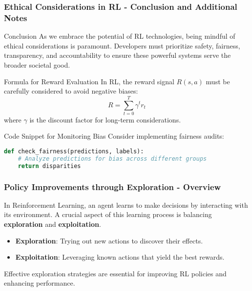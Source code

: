 \documentclass{beamer}
\begin{document}
\begin{frame}[fragile]
    \frametitle{Ethical Considerations in RL - Conclusion and Additional Notes}
    \begin{block}{Conclusion}
        As we embrace the potential of RL technologies, being mindful of ethical considerations is paramount. Developers must prioritize safety, fairness, transparency, and accountability to ensure these powerful systems serve the broader societal good.
    \end{block}
    
    \begin{block}{Formula for Reward Evaluation}
        In RL, the reward signal \( R(s, a) \) must be carefully considered to avoid negative biases:
        \begin{equation}
            R = \sum_{t=0}^{T} \gamma^t r_t
        \end{equation}
        where \( \gamma \) is the discount factor for long-term considerations.
    \end{block}
    
    \begin{block}{Code Snippet for Monitoring Bias}
        Consider implementing fairness audits:
        \begin{lstlisting}[language=python]
def check_fairness(predictions, labels):
    # Analyze predictions for bias across different groups
    return disparities
        \end{lstlisting}
    \end{block}
\end{frame}

\begin{frame}[fragile]
    \frametitle{Policy Improvements through Exploration - Overview}
    In Reinforcement Learning, an agent learns to make decisions by interacting with its environment. A crucial aspect of this learning process is balancing \textbf{exploration} and \textbf{exploitation}. 
    \begin{itemize}
        \item \textbf{Exploration}: Trying out new actions to discover their effects.
        \item \textbf{Exploitation}: Leveraging known actions that yield the best rewards.
    \end{itemize}
    Effective exploration strategies are essential for improving RL policies and enhancing performance.
\end{frame}
\end{document}
